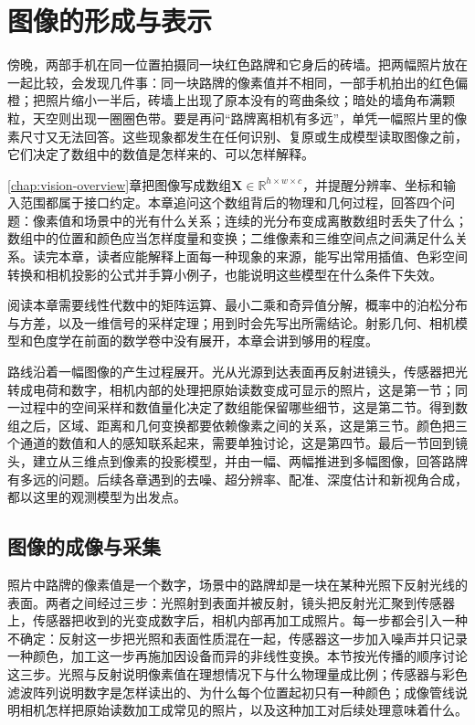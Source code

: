 \chapter{图像的形成与表示}
\label{chap:vision-image-formation}

傍晚，两部手机在同一位置拍摄同一块红色路牌和它身后的砖墙。把两幅照片放在一起比较，会发现几件事：同一块路牌的像素值并不相同，一部手机拍出的红色偏橙；把照片缩小一半后，砖墙上出现了原本没有的弯曲条纹；暗处的墙角布满颗粒，天空则出现一圈圈色带。要是再问“路牌离相机有多远”，单凭一幅照片里的像素尺寸又无法回答。这些现象都发生在任何识别、复原或生成模型读取图像之前，它们决定了数组中的数值是怎样来的、可以怎样解释。

\ref{chap:vision-overview}章把图像写成数组$\bm{X}\in\mathbb{R}^{h\times w\times c}$，并提醒分辨率、坐标和输入范围都属于接口约定。本章追问这个数组背后的物理和几何过程，回答四个问题：像素值和场景中的光有什么关系；连续的光分布变成离散数组时丢失了什么；数组中的位置和颜色应当怎样度量和变换；二维像素和三维空间点之间满足什么关系。读完本章，读者应能解释上面每一种现象的来源，能写出常用插值、色彩空间转换和相机投影的公式并手算小例子，也能说明这些模型在什么条件下失效。

阅读本章需要线性代数中的矩阵运算、最小二乘和奇异值分解，概率中的泊松分布与方差，以及一维信号的采样定理；用到时会先写出所需结论。射影几何、相机模型和色度学在前面的数学卷中没有展开，本章会讲到够用的程度。

路线沿着一幅图像的产生过程展开。光从光源到达表面再反射进镜头，传感器把光转成电荷和数字，相机内部的处理把原始读数变成可显示的照片，这是第一节；同一过程中的空间采样和数值量化决定了数组能保留哪些细节，这是第二节。得到数组之后，区域、距离和几何变换都要依赖像素之间的关系，这是第三节。颜色把三个通道的数值和人的感知联系起来，需要单独讨论，这是第四节。最后一节回到镜头，建立从三维点到像素的投影模型，并由一幅、两幅推进到多幅图像，回答路牌有多远的问题。后续各章遇到的去噪、超分辨率、配准、深度估计和新视角合成，都以这里的观测模型为出发点。

\section{图像的成像与采集}
\label{sec:vision-formation-acquisition}

照片中路牌的像素值是一个数字，场景中的路牌却是一块在某种光照下反射光线的表面。两者之间经过三步：光照射到表面并被反射，镜头把反射光汇聚到传感器上，传感器把收到的光变成数字后，相机内部再加工成照片。每一步都会引入一种不确定：反射这一步把光照和表面性质混在一起，传感器这一步加入噪声并只记录一种颜色，加工这一步再施加因设备而异的非线性变换。本节按光传播的顺序讨论这三步。光照与反射说明像素值在理想情况下与什么物理量成比例；传感器与彩色滤波阵列说明数字是怎样读出的、为什么每个位置起初只有一种颜色；成像管线说明相机怎样把原始读数加工成常见的照片，以及这种加工对后续处理意味着什么。

